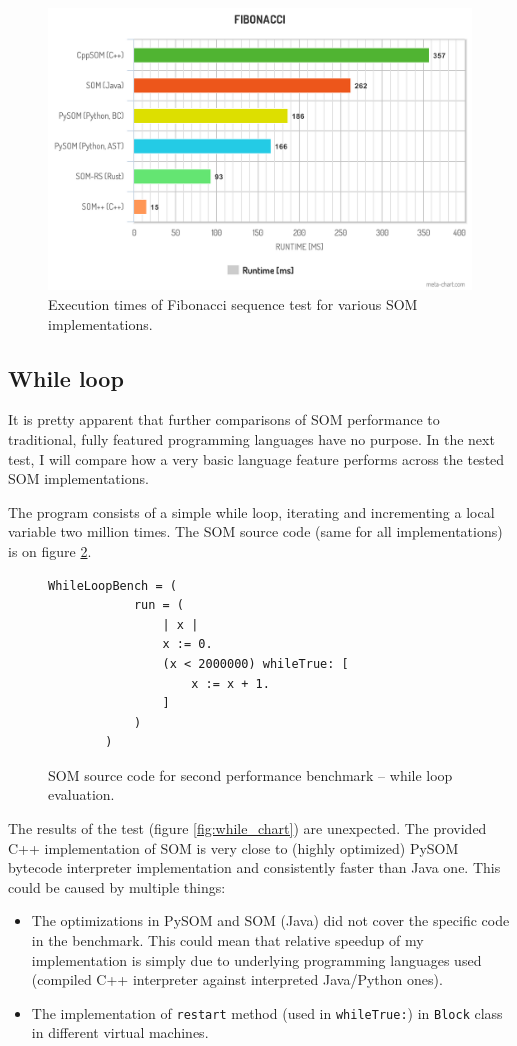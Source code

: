 \documentclass[thesis=M,english]{FITthesis}[2019/12/23]
\begin{document}
\begin{figure}
	\centering
	\includegraphics[width=\textwidth]{media/fib_chart_2.png}
	\caption{Execution times of Fibonacci sequence test for various SOM implementations.}
	\label{fig:fib_chart_2}
\end{figure}

\subsection{While loop}
It is pretty apparent that further comparisons of SOM performance to traditional, fully featured programming languages have no purpose. In the
next test, I will compare how a very basic language feature performs across the tested SOM implementations.

The program consists of a simple while loop, iterating and incrementing a local variable two million times. The SOM source code (same for all
implementations) is on figure \ref{fig:code_while_bench}.
\begin{figure}[h!]
	\centering
	\begin{lstlisting}[language=Smalltalk]
		WhileLoopBench = (
			run = (
				| x |
				x := 0.
				(x < 2000000) whileTrue: [
					x := x + 1.
				]
			)
		)
	\end{lstlisting}
	\caption{SOM source code for second performance benchmark -- while loop evaluation.}
	\label{fig:code_while_bench}
\end{figure}

The results of the test (figure \ref{fig:while_chart}) are unexpected. The provided C++ implementation of SOM is very close to (highly optimized) PySOM bytecode interpreter
implementation and consistently faster than Java one. This could be caused by multiple things:
\begin{itemize}
	\item The optimizations in PySOM and SOM (Java) did not cover the specific code in the benchmark. This could mean that relative speedup of my implementation is simply
		due to underlying programming languages used (compiled C++ interpreter against interpreted Java/Python ones).
	\item The implementation of \texttt{restart} method (used in \texttt{whileTrue:}) in \texttt{Block} class in different virtual machines.
\end{itemize} 
\end{document}
